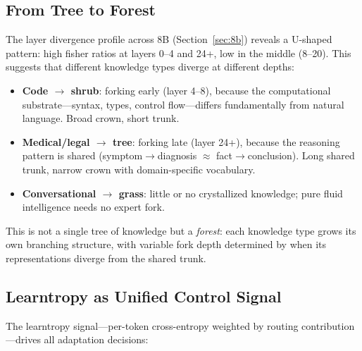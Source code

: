 \documentclass{article}
\begin{document}
\subsection{From Tree to Forest}

The layer divergence profile across 8B (Section~\ref{sec:8b}) reveals a
U-shaped pattern: high fisher ratios at layers 0--4 and 24+, low in the
middle (8--20). This suggests that different knowledge types diverge at
different depths:

\begin{itemize}[nosep,leftmargin=1em]
\item \textbf{Code $\to$ shrub}: forking early (layer 4--8), because the
      computational substrate---syntax, types, control flow---differs
      fundamentally from natural language. Broad crown, short trunk.
\item \textbf{Medical/legal $\to$ tree}: forking late (layer 24+), because
      the reasoning pattern is shared (symptom$\to$diagnosis $\approx$
      fact$\to$conclusion). Long shared trunk, narrow crown with
      domain-specific vocabulary.
\item \textbf{Conversational $\to$ grass}: little or no crystallized
      knowledge; pure fluid intelligence needs no expert fork.
\end{itemize}

This is not a single tree of knowledge but a \emph{forest}: each knowledge
type grows its own branching structure, with variable fork depth determined
by when its representations diverge from the shared trunk.

\subsection{Learntropy as Unified Control Signal}

The learntropy signal---per-token cross-entropy weighted by routing
contribution---drives all adaptation decisions:
\end{document}
